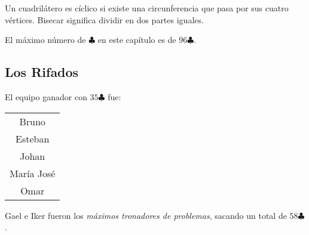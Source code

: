 \begin{remark}
    Un cuadrilátero es cíclico si existe una circunferencia que 
    pasa por sus cuatro vértices. Bisecar significa dividir 
    en dos partes iguales.
\end{remark}

\noindent El máximo número de $\clubsuit$ en este capítulo es de 
$96 \clubsuit$.

\subsection{Los Rifados}

El equipo ganador con $35 \clubsuit$ fue:

\vspace{3mm}

\begin{center}
    \begin{tabular}{|c|}
        \hline
        Bruno \\
        Esteban \\
        Johan \\
        María José \\
        Omar \\
        \hline
    \end{tabular}
\end{center}

\vspace{3mm}

\begin{moral}
    Gael e Iker fueron los \textit{máximos tronadores de 
    problemas}, sacando un total de $ 58 \clubsuit$.
\end{moral}
